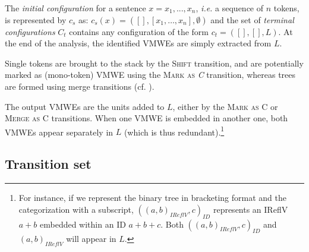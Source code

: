 \documentclass[output=paper,modfonts]{langscibook}
\begin{document}
The \emph{initial configuration} for a sentence $x = x_1, ..., x_n$, \textit{i.e.} a sequence of $n$ tokens, is represented by $c_s$ as: $c_s (x) = ([], [x_1, \ldots, x_n], \emptyset)$ and the set of \emph{terminal configurations} $C_t$ contains any configuration of the form $c_t = ([], [], L)$. At the end of the analysis, the identified VMWEs are simply extracted from $L$.

Single tokens are brought to the stack by the \textsc{Shift} transition, and are potentially marked as (mono-token) VMWE using the \textsc{Mark as \emph{C}} transition, whereas trees are formed using merge transitions (cf.  ).

The output VMWEs are the units added to $L$, either by the \textsc{Mark as C} or \textsc{Merge as C} transitions. When one VMWE is embedded in another one, both VMWEs appear separately in $L$ (which is thus redundant).\footnote{For instance, if we represent the binary tree in bracketing format and the categorization with a subscript, $( (a, b)_{IReflV}, c )_{ID}$ represents an IReflV $a+b$ embedded within an ID $a+b+c$. Both $( (a, b)_{IReflV}, c )_{ID}$ and $(a, b)_{IReflV}$ will appear in $L$.}

\subsection{Transition set} 
\label{sec:transitionset}
\end{document}
